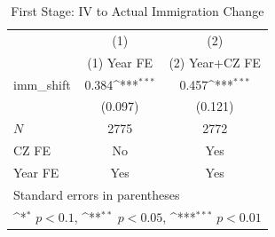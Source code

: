 \begin{table}[htbp]\centering
\def\sym#1{\ifmmode^{#1}\else\(^{#1}\)\fi}
\caption{First Stage: IV to Actual Immigration Change}
\begin{tabular}{l*{2}{c}}
\hline\hline
            &\multicolumn{1}{c}{(1)}&\multicolumn{1}{c}{(2)}\\
            &\multicolumn{1}{c}{(1) Year FE}&\multicolumn{1}{c}{(2) Year+CZ FE}\\
\hline
imm\_shift   &       0.384\sym{***}&       0.457\sym{***}\\
            &     (0.097)         &     (0.121)         \\
\hline
\(N\)       &        2775         &        2772         \\
CZ FE       &          No         &         Yes         \\
Year FE     &         Yes         &         Yes         \\
\hline\hline
\multicolumn{3}{l}{\footnotesize Standard errors in parentheses}\\
\multicolumn{3}{l}{\footnotesize \sym{*} \(p<0.1\), \sym{**} \(p<0.05\), \sym{***} \(p<0.01\)}\\
\end{tabular}
\end{table}
